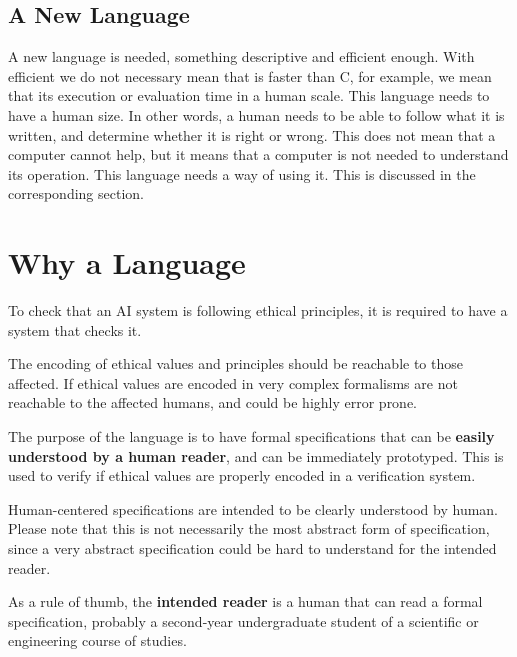 \subsection{A New Language}

A new language is needed, something descriptive and efficient enough.
With efficient we do not necessary mean that is faster than C, for example, we mean that its execution or evaluation time in a human scale.
This language needs to have a human size.
In other words, a human needs to be able to follow what it is written, and determine whether it is right or wrong.
This does not mean that a computer cannot help, but it means that a computer is not needed to understand its operation.
This language needs a way of using it.
This is discussed in the corresponding section.



\section{Why a Language}

To check that an AI system is following ethical principles, it is required to have a system that checks it.

The encoding of ethical values and principles should be reachable to those affected.
If ethical values are encoded in very complex formalisms are not reachable to the affected humans, and could be highly error prone.

The purpose of the language is to have formal specifications that can be \textbf{easily understood by a human reader}, and can be immediately prototyped.
This is used to verify if ethical values are properly encoded in a verification system.

Human-centered specifications are intended to be clearly understood by human.
Please note that this is not necessarily the most abstract form of specification, since a very abstract specification could be hard to understand for the intended reader.

As a rule of thumb, the \textbf{intended reader} is a human that can read a formal specification, probably a second-year undergraduate student of a scientific or engineering course of studies.

